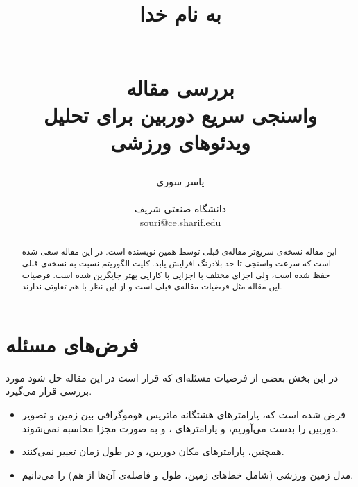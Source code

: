 \documentclass{report}
\title{
\begin{normalsize}
به نام خدا
\end{normalsize}
\\[2cm]
بررسی مقاله
\\[1cm]
واسنجی سریع دوربین برای تحلیل ویدئوهای ورزشی
}
\author{یاسر سوری
\\
\\ \small دانشگاه صنعتی شریف
\\ \small souri@ce.sharif.edu
}
\begin{document}
\maketitle

\begin{abstract}
این مقاله\cite{new_paper} نسخه‌ی سریع‌تر مقاله‌ی قبلی\cite{old_paper} توسط همین نویسنده است. در این مقاله سعی شده است که سرعت واسنجی تا حد بلادرنگ افزایش یابد. کلیت الگوریتم نسبت به نسخه‌ی قبلی حفظ شده است، ولی اجزای مختلف با اجزایی با کارایی بهتر جایگزین شده است. فرضیات این مقاله مثل فرضیات مقاله‌ی قبلی است و از این نظر با هم تفاوتی ندارند.

\end{abstract}

\section{فرض‌های مسئله}
در این بخش بعضی از فرضیات مسئله‌ای که قرار است در این مقاله حل شود مورد بررسی قرار می‌گیرد.
\begin{itemize}
\item
فرض شده است که، پارامتر‌های هشتگانه ماتریس هوموگرافی بین زمین و تصویر دوربین را بدست می‌آوریم، و پارامترهای ،  و  به صورت مجزا محاسبه نمی‌شوند.
\item
همچنین، پارامترهای مکان دوربین،  و  در طول زمان تغییر نمی‌کنند.
\item
مدل زمین ورزشی (شامل خط‌های زمین، طول و فاصله‌ی آن‌ها از هم) را می‌دانیم.
\end{itemize}
\end{document}
